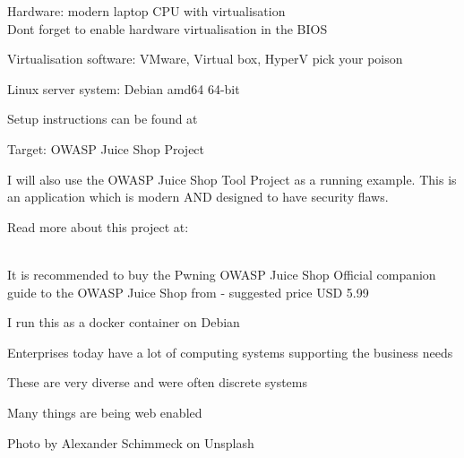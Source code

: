 \documentclass[Screen16to9,17pt]{foils}
\begin{document}


\begin{list2}
\item Hardware: modern laptop CPU with virtualisation\\
Dont forget to enable hardware virtualisation in the BIOS
\item Virtualisation software: VMware, Virtual box, HyperV pick your poison
\item Linux server system: Debian amd64 64-bit 
\item Setup instructions can be found at 
\item Target: OWASP Juice Shop Project

\end{list2}



I will also use the OWASP Juice Shop Tool Project as a running example. This is an application which is modern AND designed to have security flaws.

Read more about this project at:\\
\\

It is recommended to buy the Pwning OWASP Juice Shop Official companion guide to the OWASP Juice Shop from  - suggested price USD 5.99

I run this as a docker container on Debian





\begin{list2}
\item Enterprises today have a lot of computing systems supporting the business needs
\item These are very diverse and were often discrete systems
\item Many things are being web enabled
\end{list2}

\hfill Photo by Alexander Schimmeck on Unsplash
\end{document}
